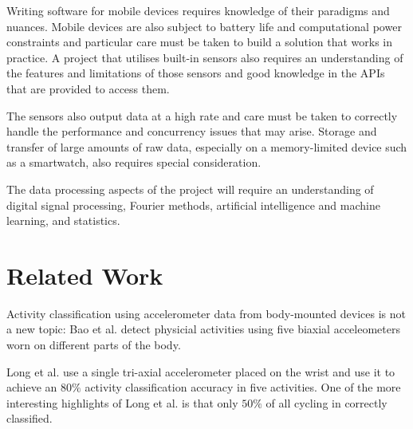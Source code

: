     Writing software for mobile devices requires knowledge of their paradigms and nuances.
    Mobile devices are also subject to battery life and computational power constraints and   
    particular care must be taken to build a solution that works in practice.  
    A project that utilises built-in sensors also requires an understanding of the features and 
    limitations of those sensors and good knowledge in the APIs that are provided to access them.

    The sensors also output data at a high rate and care must be taken to correctly handle the
    performance and concurrency issues that may arise. Storage and transfer of large amounts of
    raw data, especially on a memory-limited device such as a smartwatch, also requires special
    consideration. 
    
    The data processing aspects of the project will require an understanding of digital signal 
    processing, Fourier methods, artificial intelligence and machine learning, and statistics.
  
  \section{Related Work}
  \label{sec:intro-relatedwork}
    Activity classification using accelerometer data from body-mounted devices is not a new topic: 
    Bao et al. \cite{bao2004activity} detect physicial activities using five biaxial acceleometers
    worn on different parts of the body. 
    
    Long et al. \cite{long2009single} use a single tri-axial accelerometer placed on the wrist and 
    use it to achieve an $80\%$ activity classification accuracy in five activities. One of the
    more interesting highlights of Long et al. is that only $50\%$ of all cycling in correctly
    classified.
    
    
